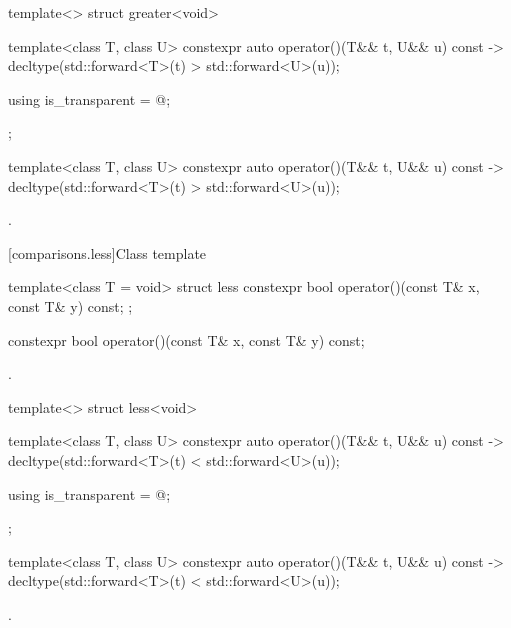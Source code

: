 %
\begin{itemdecl}
template<> struct greater<void> {
  template<class T, class U> constexpr auto operator()(T&& t, U&& u) const
    -> decltype(std::forward<T>(t) > std::forward<U>(u));

  using is_transparent = @\unspec@;
};
\end{itemdecl}

%
\begin{itemdecl}
template<class T, class U> constexpr auto operator()(T&& t, U&& u) const
    -> decltype(std::forward<T>(t) > std::forward<U>(u));
\end{itemdecl}

\begin{itemdescr}
\pnum
\returns
{}.
\end{itemdescr}

[comparisons.less]{Class template }

%
\begin{itemdecl}
template<class T = void> struct less {
  constexpr bool operator()(const T& x, const T& y) const;
};
\end{itemdecl}

%
\begin{itemdecl}
constexpr bool operator()(const T& x, const T& y) const;
\end{itemdecl}

\begin{itemdescr}
\pnum
\returns
{}.
\end{itemdescr}

%
\begin{itemdecl}
template<> struct less<void> {
  template<class T, class U> constexpr auto operator()(T&& t, U&& u) const
    -> decltype(std::forward<T>(t) < std::forward<U>(u));

  using is_transparent = @\unspec@;
};
\end{itemdecl}

%
\begin{itemdecl}
template<class T, class U> constexpr auto operator()(T&& t, U&& u) const
    -> decltype(std::forward<T>(t) < std::forward<U>(u));
\end{itemdecl}

\begin{itemdescr}
\pnum
\returns
{}.
\end{itemdescr}

